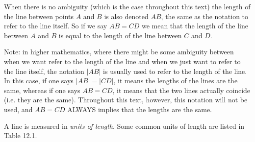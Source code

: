       \label{m39370*id313175}When there is no ambiguity (which is the case throughout this text) the length of the line between points $A$ and $B$ is also denoted $AB$\hspace{1ex}, the same as the notation to refer to the line itself. So if we say $AB=CD$\hspace{1ex} we mean that the length of the line between $A$ and $B$ is equal to the length of the line between $C$ and $D$.
\par 
      \label{m39370*eip-313}Note: in higher mathematics, where there might be some ambiguity between when we want refer to the length of the line and when we just want to refer to the line itself, the notation $|AB|$\hspace{1ex} is usually used to refer to the length of the line. In this case, if one says $|AB|=|CD|$, it means the lengths of the lines are the same, whereas if one says $AB=CD$, it means that the two lines actually coincide (i.e. they are the same). Throughout this text, however, this notation will not be used, and $AB=CD$ ALWAYS implies that the lengths are the same. \par \label{m39370*id314000}A line is measured in \textsl{units of length}. Some common units of length are listed in Table 12.1.\par 
